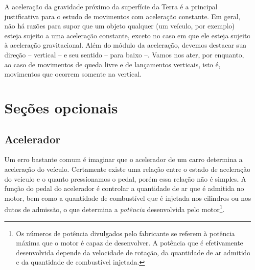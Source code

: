 A aceleração da gravidade próximo da superfície da Terra é a principal justificativa para o estudo de movimentos com aceleração constante. Em geral, não há razões para supor que um objeto qualquer (um veículo, por exemplo) esteja sujeito a uma aceleração constante, exceto no caso em que ele esteja sujeito à aceleração gravitacional. Além do módulo da aceleração, devemos destacar sua direção -- vertical -- e seu sentido -- para baixo --. Vamos nos ater, por enquanto, ao caso de movimentos de queda livre e de lançamentos verticais, isto é, movimentos que ocorrem somente na vertical.

\section{Seções opcionais}

\subsection{Acelerador}

Um erro bastante comum é imaginar que o acelerador de um carro determina a aceleração do veículo. Certamente existe uma relação entre o estado de aceleração do veículo e o quanto pressionamos o pedal, porém essa relação não é simples. A função do pedal do acelerador é controlar a quantidade de ar que é admitida no motor, bem como a quantidade de combustível que é injetada nos cilindros ou nos dutos de admissão, o que determina a \emph{potência} desenvolvida pelo motor\footnote{Os números de potência divulgados pelo fabricante se referem à potência máxima que o motor é capaz de desenvolver. A potência que é efetivamente desenvolvida depende da velocidade de rotação, da quantidade de ar admitido e da quantidade de combustível injetada.}.

